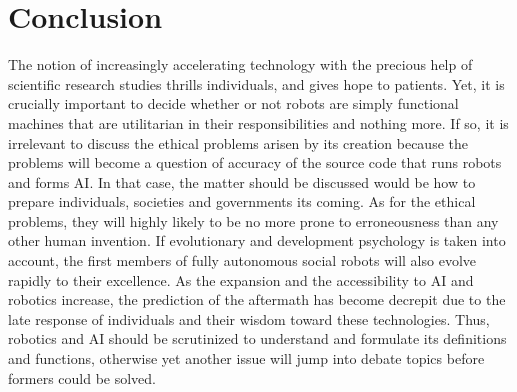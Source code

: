 \documentclass[man]{apa6}
\begin{document}
\section{Conclusion}
The notion of increasingly accelerating technology with the precious help of scientific research studies thrills individuals, and gives hope to patients.
Yet, it is crucially important to decide whether or not robots are simply functional machines that are utilitarian in their responsibilities and nothing more. If so, it is irrelevant to discuss the ethical problems arisen by its creation because the problems will become a question of accuracy of the source code that runs robots and forms AI. In that case, the matter should be discussed would be how to prepare individuals, societies and governments its coming. As for the ethical problems, they will highly likely to be no more prone to erroneousness than any other human invention. If evolutionary and development psychology is taken into account, the first members of fully autonomous social robots will also evolve rapidly to their excellence. As the expansion and the accessibility to AI and robotics increase, the prediction of the aftermath has become decrepit due to the late response of individuals and their wisdom toward these technologies. Thus, robotics and AI should be scrutinized to understand and formulate its definitions and functions, otherwise yet another issue will jump into debate topics before formers could be solved. 


\end{document}
